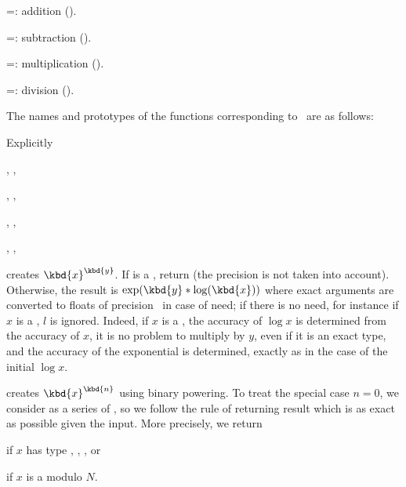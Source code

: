 \op=: addition ().

\op=: subtraction ().

\op=: multiplication ().

\op=: division ().

\noindent The names and prototypes of the functions corresponding
to \op\ are as follows:




\noindent Explicitly

, ,

, ,

, ,

, ,


 creates $\kbd{x}^{\kbd{y}}$. If
 is a , return  (the precision  is not
taken into account). Otherwise, the result is $\exp(\kbd{y}*\log(\kbd{x}))$
where exact arguments are converted to floats of precision~ in case of
need; if there is no need, for instance if $x$ is a , $l$ is
ignored. Indeed, if $x$ is a , the accuracy of $\log x$ is
determined from the accuracy of $x$, it is no problem to multiply by $y$,
even if it is an exact type, and the accuracy of the exponential is
determined, exactly as in the case of the initial $\log x$.

 creates $\kbd{x}^{\kbd{n}}$ using
binary powering. To treat the special case $n = 0$, we consider
 as a series of , so we follow the rule of returning
result which is as exact as possible given the input. More precisely,
we return

\item {} if $x$ has type , ,  , or

\item {} if $x$ is a  modulo $N$.

